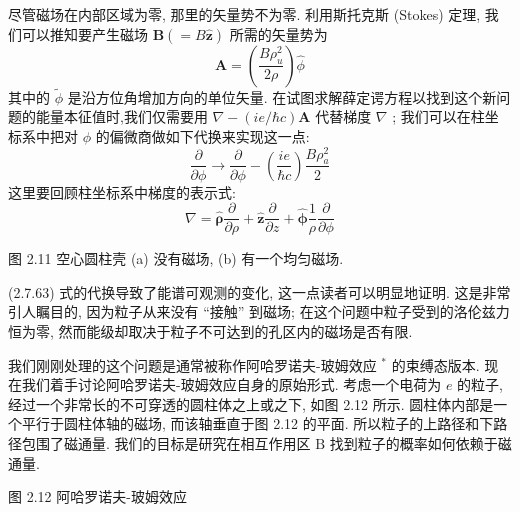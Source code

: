 \documentclass[lang=cn,newtx,10pt,scheme=chinese,thmcnt=section]{elegantbook}
\begin{document}
尽管磁场在内部区域为零, 那里的矢量势不为零. 利用斯托克斯 (Stokes) 定理, 我们可以推知要产生磁场 $\mathbf{B}\left( { = B\widehat{\mathbf{z}}}\right)$ 所需的矢量势为
\begin{equation}
	\mathbf{A} = \left( \frac{B{\rho }_{u}^{2}}{2\rho }\right) \widehat{\phi }
\end{equation}
其中的 $\widetilde{\phi }$ 是沿方位角增加方向的单位矢量. 在试图求解薛定谔方程以找到这个新问题的能量本征值时,我们仅需要用 $\nabla - \left( {{ie}/\hbar c}\right) \mathbf{A}$ 代替梯度 $\nabla$ ; 我们可以在柱坐标系中把对 $\phi$ 的偏微商做如下代换来实现这一点:
\begin{equation}
	\frac{\partial }{\partial \phi } \rightarrow \frac{\partial }{\partial \phi } - \left( \frac{ie}{\hbar c}\right) \frac{B{\rho }_{a}^{2}}{2}
\end{equation}
这里要回顾柱坐标系中梯度的表示式:
\begin{equation}
	\nabla = \widehat{\mathbf{\rho }}\frac{\partial }{\partial \rho } + \widehat{\mathbf{z}}\frac{\partial }{\partial z} + \widehat{\mathbf{\phi }}\frac{1}{\rho }\frac{\partial }{\partial \phi }
\end{equation}

图 2.11 空心圆柱壳 (a) 没有磁场, (b) 有一个均匀磁场.

(2.7.63) 式的代换导致了能谱可观测的变化, 这一点读者可以明显地证明. 这是非常引人瞩目的, 因为粒子从来没有 “接触” 到磁场; 在这个问题中粒子受到的洛伦兹力恒为零, 然而能级却取决于粒子不可达到的孔区内的磁场是否有限.

我们刚刚处理的这个问题是通常被称作阿哈罗诺夫-玻姆效应 ${}^{ * }$ 的束缚态版本. 现在我们着手讨论阿哈罗诺夫-玻姆效应自身的原始形式. 考虑一个电荷为 $e$ 的粒子,经过一个非常长的不可穿透的圆柱体之上或之下, 如图 2.12 所示. 圆柱体内部是一个平行于圆柱体轴的磁场, 而该轴垂直于图 2.12 的平面. 所以粒子的上路径和下路径包围了磁通量. 我们的目标是研究在相互作用区 $\mathrm{B}$ 找到粒子的概率如何依赖于磁通量.

图 2.12 阿哈罗诺夫-玻姆效应
\end{document}
